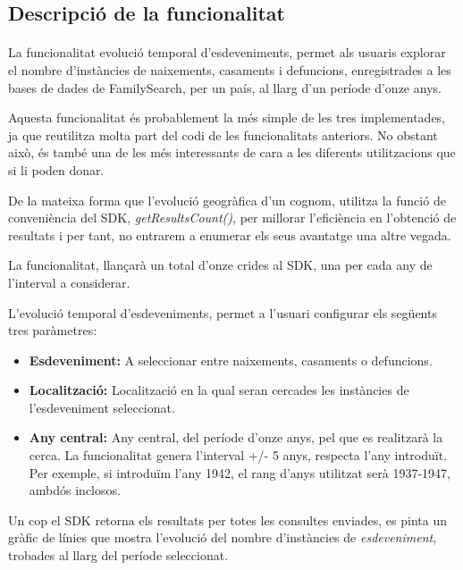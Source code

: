 \subsection{Descripció de la funcionalitat}

\paragraph{}
La funcionalitat evolució temporal d'esdeveniments, permet als usuaris explorar el nombre d'instàncies de naixements, casaments i defuncions, enregistrades a les bases de dades de FamilySearch, per un país, al llarg d'un període d'onze anys.

Aquesta funcionalitat és probablement la més simple de les tres implementades, ja que reutilitza molta part del codi de les funcionalitats anteriors. No obstant això, és també una de les més interessants de cara a les diferents utilitzacions que si li poden donar.

De la mateixa forma que l'evolució geogràfica d'un cognom, utilitza la funció de conveniència del SDK, \emph{getResultsCount()}, per millorar l’eficiència en l’obtenció de resultats i per tant, no entrarem a enumerar els seus avantatge una altre vegada.

La funcionalitat, llançarà un total d’onze crides al SDK, una per cada any de l’interval a considerar.

L'evolució temporal d'esdeveniments, permet a l'usuari configurar els següents tres paràmetres:

\begin{itemize}
    \item \textbf{Esdeveniment:} A seleccionar entre naixements, casaments o defuncions.
    \item \textbf{Localització:} Localització en la qual seran cercades les instàncies de l'esde\-ve\-niment seleccionat.
    \item \textbf{Any central:} Any central, del període d’onze anys, pel que es realitzarà la cerca. La funcionalitat genera l’interval +/- 5 anys, respecta l'any introduït. Per exemple, si introduïm l'any 1942, el rang d'anys utilitzat serà 1937-1947, ambdós inclosos.
\end{itemize}

Un cop el SDK retorna els resultats per totes les consultes enviades, es pinta un gràfic de línies que mostra l'evolució del nombre d'instàncies de \emph{esdeveniment}, trobades al llarg del període seleccionat.
